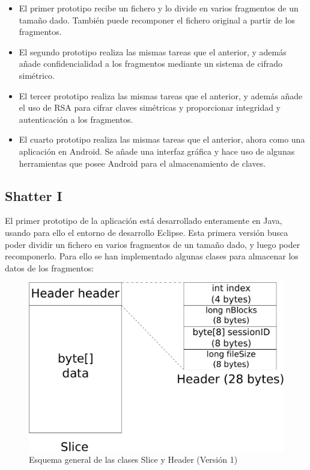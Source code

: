 \begin{itemize}
  \item El primer prototipo recibe un fichero y lo divide en varios fragmentos
  de un tamaño dado. También puede recomponer el fichero original a partir de
  los fragmentos.

  \item El segundo prototipo realiza las mismas tareas que el anterior, y además
  añade confidencialidad a los fragmentos mediante un sistema de cifrado
  simétrico.

  \item El tercer prototipo realiza las mismas tareas que el anterior, y además
  añade el uso de RSA para cifrar claves simétricas y proporcionar integridad y
  autenticación a los fragmentos.

  \item El cuarto prototipo realiza las mismas tareas que el anterior, ahora
  como una aplicación en Android. Se añade una interfaz gráfica y hace uso de
  algunas herramientas que posee Android para el almacenamiento de claves.
\end{itemize}

\subsection{Shatter I}

El primer prototipo de la aplicación está desarrollado enteramente en Java,
usando para ello el entorno de desarrollo Eclipse. Esta primera versión busca
poder dividir un fichero en varios fragmentos de un tamaño dado, y luego poder
recomponerlo. Para ello se han implementado algunas clases para almacenar los
datos de los fragmentos:

\begin{figure}[!htb]
  \centering
  \includegraphics[scale=0.4]{Figures/Slice_Header_1}
  \decoRule
  \caption[Slice - Header (Versión 1)]{Esquema general de las clases Slice y Header (Versión 1)}
  \label{fig:Slice_Header_1}
\end{figure}

